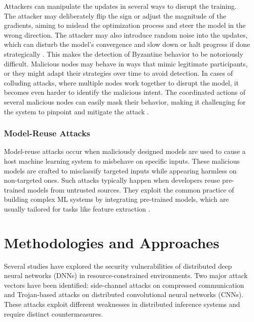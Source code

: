\documentclass[conference]{IEEEtran}
\begin{document}
Attackers can manipulate the updates in several ways to disrupt the training. The attacker may deliberately flip the sign or adjust the magnitude of the gradients, aiming to mislead the optimization process and steer the model in the wrong direction. The attacker may also introduce random noise into the updates, which can disturb the model’s convergence and slow down or halt progress if done strategically \cite{shi2022challenges}. This makes the detection of Byzantine behavior to be notoriously difficult. Malicious nodes may behave in ways that mimic legitimate participants, or they might adapt their strategies over time to avoid detection. In cases of colluding attacks, where multiple nodes work together to disrupt the model, it becomes even harder to identify the malicious intent. The coordinated actions of several malicious nodes can easily mask their behavior, making it challenging for the system to pinpoint and mitigate the attack \cite{shi2022challenges, wu2021tolerating}.



\subsubsection{Model-Reuse Attacks}
Model-reuse attacks occur when maliciously designed models are used to cause a host machine learning system to misbehave on specific inputs. These malicious models are crafted to misclassify targeted inputs while appearing harmless on non-targeted ones. Such attacks typically happen when developers reuse pre-trained models from untrusted sources. They exploit the common practice of building complex ML systems by integrating pre-trained models, which are usually tailored for tasks like feature extraction \cite{ji2018model}.






\section{Methodologies and Approaches}

Several studies have explored the security vulnerabilities of distributed deep neural networks (DNNs) in resource-constrained environments. Two major attack vectors have been identified: side-channel attacks on compressed communication and Trojan-based attacks on distributed convolutional neural networks (CNNs). These attacks exploit different weaknesses in distributed inference systems and require distinct countermeasures.
\end{document}
